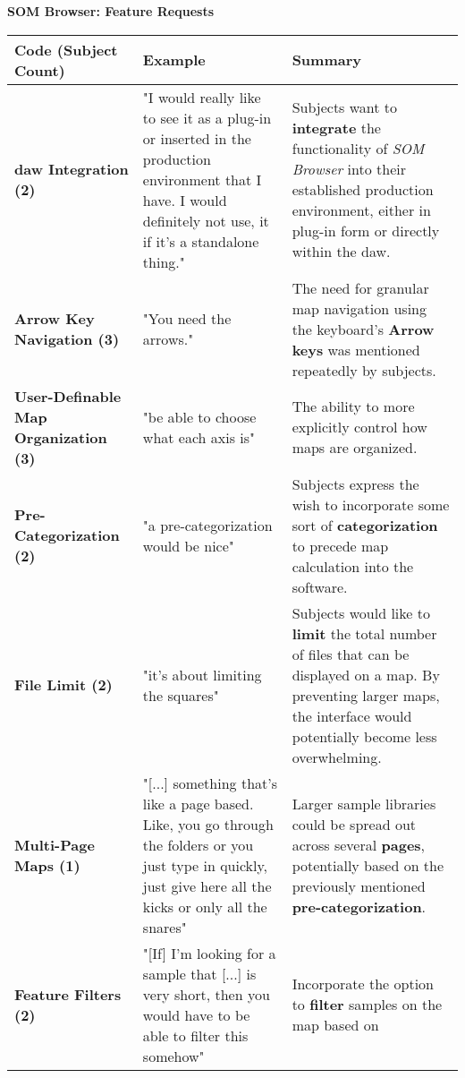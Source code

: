 \begin{table}[!htb]
  \renewcommand{\arraystretch}{1.2}
  \centering
  \textbf{SOM Browser: Feature Requests} \\ [3mm]
  \footnotesize
  \colorbox{light-bg}{
  \begin{tabular}{ p{4.0cm} p{4.75cm} p{4.75cm} }
    \hline
    \textbf{Code (Subject Count)} & \textbf{Example} & \textbf{Summary} \\
    \hline
    \textbf{\gls{daw} Integration (2)}
    &
    "I would really like to see it as a plug-in or inserted in the production
    environment that I have. I would definitely not use, it if it's a
    standalone thing."
    &
    Subjects want to \textbf{integrate} the functionality of
    \textit{SOM Browser} into their established production environment, either
    in plug-in form or directly within the \gls{daw}.
    \\
    \textbf{Arrow Key Navigation (3)}
    &
    "You need the arrows."
    &
    The need for granular map navigation using the keyboard's
    \textbf{Arrow keys} was mentioned repeatedly by subjects.
    \\
    \textbf{User-Definable Map Organization (3)}
    &
    "be able to choose what each axis is"
    &
    The ability to more explicitly control how maps are organized.
    \\
    \textbf{Pre-Categorization (2)}
    &
    "a pre-categorization would be nice"
    &
    Subjects express the wish to incorporate some sort of
    \textbf{categorization} to precede map calculation into the software.
    \\
    \textbf{File Limit (2)}
    &
    "it’s about limiting the squares"
    &
    Subjects would like to \textbf{limit} the total number of files that can be
    displayed on a map. By preventing larger maps, the interface would
    potentially become less overwhelming.
    \\
    \textbf{Multi-Page Maps (1)}
    &
    "[...] something that’s like a page based. Like, you go through the folders
    or you just type in quickly, just give here all the kicks or only all the
    snares"
    &
    Larger sample libraries could be spread out across several \textbf{pages},
    potentially based on the previously mentioned \textbf{pre-categorization}.
    \\
    \textbf{Feature Filters (2)}
    &
    "[If] I'm looking for a sample that [...] is very short, then you
    would have to be able to filter this somehow"
    &
    Incorporate the option to \textbf{filter} samples on the map based on

\end{tabular}}
\end{table}
